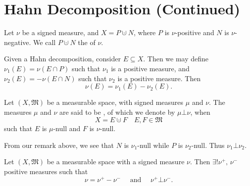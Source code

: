 \documentclass[notoc,notitlepage]{tufte-book}
\begin{document}
\section{Hahn Decomposition (Continued)}%
\label{sec:hahn_decomposition_continued}

\begin{defn}\label{defn:hahn_decomposition}
  Let $\nu$ be a signed measure, and $X = P \cupdot N$,
  where $P$ is $\nu$-positive and $N$ is $\nu$-negative.
  We call $P \cupdot N$ the  of $\nu$.
\end{defn}

\begin{remark}
  Given a Hahn decomposition, consider $E \subseteq X$.
  Then we may define $\nu_1(E) = \nu(E \cap P)$
  such that $\nu_1$ is a positive measure, and
  $\nu_2(E) = - \nu(E \cap N)$ such that $\nu_2$ is a positive measure.
  Then
  \begin{equation*}
    \nu(E) = \nu_1(E) - \nu_2(E).
  \end{equation*}
\end{remark}

\begin{defn}\label{defn:mutually_singular}
  Let $(X, \mathfrak{M})$ be a measurable space,
  with signed measures $\mu$ and $\nu$.
  The measures $\mu$ and $\nu$ are said to be ,
  of which we denote by $\mu \bot \nu$, when
  \begin{equation*}
    X = E \cupdot F \quad E, F \in \mathfrak{M}
  \end{equation*}
  such that $E$ is $\mu$-null and $F$ is $\nu$-null.
\end{defn}

\begin{eg}
  From our remark above, we see that $N$ is $\nu_1$-null while
  $P$ is $\nu_2$-null. Thus $\nu_1 \bot \nu_2$.
\end{eg}

\begin{thm}\label{thm:jordan_decomposition_theorem}
  Let $(X, \mathfrak{M})$ be a measurable space with a signed measure $\nu$.
  Then $\exists! \nu^+,\, \nu^-$ positive measures such that
  \begin{equation*}
    \nu = \nu^+ - \nu^- \quad\text{ and }\quad \nu^+ \bot \nu^-.
  \end{equation*}
\end{thm}
\end{document}
